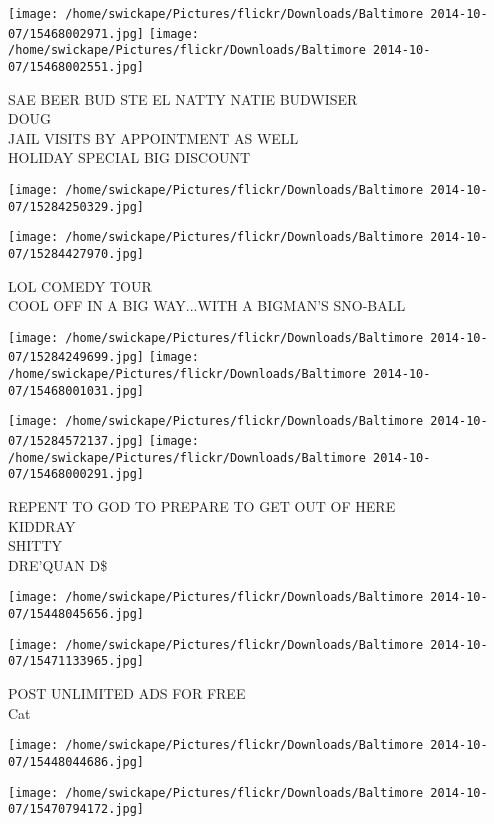 \documentclass[10pt,letterpaper]{article}
\begin{document}
\texttt{[image: /home/swickape/Pictures/flickr/Downloads/Baltimore 2014-10-07/15468002971.jpg]}
\texttt{[image: /home/swickape/Pictures/flickr/Downloads/Baltimore 2014-10-07/15468002551.jpg]}

SAE BEER BUD STE EL NATTY NATIE BUDWISER\\
DOUG\\
JAIL VISITS BY APPOINTMENT AS WELL\\
HOLIDAY SPECIAL BIG DISCOUNT
\pagebreak

\texttt{[image: /home/swickape/Pictures/flickr/Downloads/Baltimore 2014-10-07/15284250329.jpg]}

\vspace{0.25in}
\texttt{[image: /home/swickape/Pictures/flickr/Downloads/Baltimore 2014-10-07/15284427970.jpg]}

LOL COMEDY TOUR\\
COOL OFF IN A BIG WAY...WITH A BIGMAN'S SNO{-}BALL
\pagebreak

\texttt{[image: /home/swickape/Pictures/flickr/Downloads/Baltimore 2014-10-07/15284249699.jpg]}
\texttt{[image: /home/swickape/Pictures/flickr/Downloads/Baltimore 2014-10-07/15468001031.jpg]}

\texttt{[image: /home/swickape/Pictures/flickr/Downloads/Baltimore 2014-10-07/15284572137.jpg]}
\texttt{[image: /home/swickape/Pictures/flickr/Downloads/Baltimore 2014-10-07/15468000291.jpg]}

REPENT TO GOD TO PREPARE TO GET OUT OF HERE\\
KIDDRAY\\
SHITTY\\
DRE'QUAN D\$
\pagebreak

\texttt{[image: /home/swickape/Pictures/flickr/Downloads/Baltimore 2014-10-07/15448045656.jpg]}

\vspace{0.25in}
\texttt{[image: /home/swickape/Pictures/flickr/Downloads/Baltimore 2014-10-07/15471133965.jpg]}

POST UNLIMITED ADS FOR FREE\\
Cat
\pagebreak

\texttt{[image: /home/swickape/Pictures/flickr/Downloads/Baltimore 2014-10-07/15448044686.jpg]}

\vspace{0.25in}
\texttt{[image: /home/swickape/Pictures/flickr/Downloads/Baltimore 2014-10-07/15470794172.jpg]}
\end{document}
